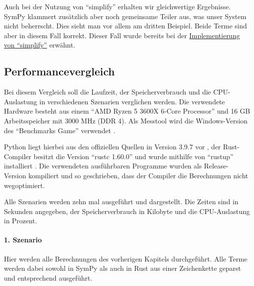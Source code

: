 \documentclass[11pt,a4paper, ngerman]{article}
\begin{document}
Auch bei der Nutzung von ``simplify'' erhalten wir gleichwertige Ergebnisse. SymPy klammert zusätzlich aber noch gemeinsame Teiler aus, was unser System nicht beherrscht. Dies sieht man vor allem am dritten Beispiel. Beide Terme sind aber in diesem Fall korrekt. Dieser Fall wurde bereits bei der \hyperref[sec:Regel2Simp]{Implementierung von ``simplify''} erwähnt.

\subsection{Performancevergleich}
Bei diesem Vergleich soll die Laufzeit, der Speicherverbrauch und die CPU-Auslastung in verschiedenen Szenarien verglichen werden. Die verwendete Hardware besteht aus einem ``AMD Ryzen 5 3600X 6-Core Processor'' und 16 GB Arbeitsspeicher mit 3000 MHz (DDR 4). Als Messtool wird die Windows-Version des ``Benchmarks Game'' verwendet \cite{BenchmarkGameHome} \cite {BenchmarkGameSrc}.

Python liegt hierbei aus den offiziellen Quellen in Version 3.9.7 vor \cite{PythonDownload}, der Rust-Compiler besitzt die Version ``rustc 1.60.0'' und wurde mithilfe von ``rustup'' installiert \cite{RustDownload}. Die verwendeten ausführbaren Programme wurden als Release-Version kompiliert und so geschrieben, dass der Compiler die Berechnungen nicht wegoptimiert.

Alle Szenarien werden zehn mal ausgeführt und dargestellt. Die Zeiten sind in Sekunden angegeben, der Speicherverbrauch in Kilobyte und die CPU-Auslastung in Prozent.

\paragraph{1. Szenario} Hier werden alle Berechnungen des vorherigen Kapitels durchgeführt. Alle Terme werden dabei sowohl in SymPy als auch in Rust aus einer Zeichenkette geparst und entsprechend ausgeführt.
\end{document}
